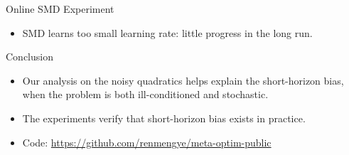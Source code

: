 \documentclass[final,t]{beamer}
\begin{document}
\begin{frame}{}
\begin{columns}[t]
\begin{column}{.32\linewidth}
\begin{exampleblock}{Online SMD Experiment}
\begin{itemize}
            \item SMD learns too small learning rate: little progress in the long run.
		\end{itemize}
	\end{exampleblock}
    \begin{exampleblock}{Conclusion}
    \begin{itemize}
    \item Our analysis on the noisy quadratics helps explain the short-horizon bias, when the problem is both ill-conditioned and stochastic.
    \item The experiments verify that short-horizon bias exists in practice.
    \item Code: \url{https://github.com/renmengye/meta-optim-public}
    \end{itemize}
    \end{exampleblock}
\end{column}

\end{columns}
\end{frame}
\end{document}
